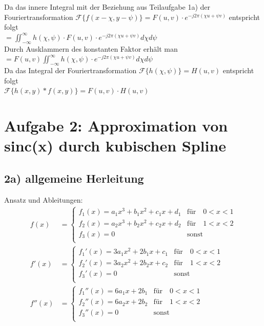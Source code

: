\documentclass[a4paper,11pt,oneside]{scrartcl}
\begin{document}
Da das innere Integral mit der Beziehung aus Teilaufgabe 1a) der Fouriertransformation $\mathcal{F}\{f(x-\chi,y-\psi)\}=F(u,v)\cdot e^{-j2\pi(\chi u+\psi v)}$ entspricht folgt \\

$=\iint_{-\infty}^{\infty}h(\chi,\psi)\cdot F(u,v)\cdot e^{-j2\pi(\chi u+\psi v)} d\chi d\psi$ \\

Durch Ausklammern des konstanten Faktor erhält man \\

$=F(u,v)\iint_{-\infty}^{\infty}h(\chi,\psi)\cdot e^{-j2\pi(\chi u+\psi v)} d\chi d\psi$ \\

Da das Integral der Fouriertransformation $\mathcal{F}\{h(\chi,\psi)\}=H(u,v)$ entspricht folgt \\

$\mathcal{F}\{h(x,y)\ast f(x,y)\}=F(u,v)\cdot H(u,v)$

\newpage

\section*{Aufgabe 2: Approximation von sinc(x) durch kubischen Spline}
\subsection*{2a) allgemeine Herleitung}
Ansatz und Ableitungen:\\
\begin{equation*}
\begin{array}{ll}
f(x) & = 
 \left\{ 
  \begin{array}{ll}
   f_1(x) = a_1x^3 + b_1x^2 + c_1x + d_1 & \text{für} \quad 0 < x < 1\\
   f_2(x) = a_2x^3 + b_2x^2 + c_2x + d_2 & \text{für} \quad 1 < x < 2\\
   f_3(x) = 0 & \text{sonst}\\
  \end{array} 
 \right.
\\[1cm]
f'(x) & = 
 \left\{ 
  \begin{array}{ll}
   f_1'(x) = 3a_1x^2 + 2b_1x + c_1 & \text{für} \quad 0 < x < 1\\
   f_2'(x) = 3a_2x^2 + 2b_2x + c_2 & \text{für} \quad 1 < x < 2\\
   f_3'(x) = 0 & \text{sonst}\\
  \end{array} 
 \right.
\\[1cm]
f''(x) & = 
 \left\{
  \begin{array}{ll}
   f_1''(x) = 6a_1x + 2b_1 & \text{für} \quad 0 < x < 1\\
   f_2''(x) = 6a_2x + 2b_2 & \text{für} \quad 1 < x < 2\\
   f_3''(x) = 0 & \text{sonst}\\
  \end{array}
 \right.
 \end{array}
\end{equation*}
\end{document}

